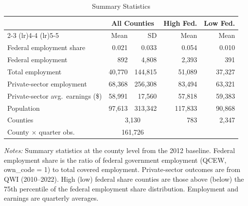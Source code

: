 \begin{table}[t]
\centering
\caption{Summary Statistics}
\label{tab:summary}
\begin{tabular}{l *{4}{r}}
\hline\hline
& \multicolumn{2}{c}{All Counties} & \multicolumn{1}{c}{High Fed.} & \multicolumn{1}{c}{Low Fed.} \\
\cmidrule(lr){2-3} \cmidrule(lr){4-4} \cmidrule(lr){5-5}
& Mean & SD & Mean & Mean \\
\hline
Federal employment share & 0.021 & 0.033 & 0.054 & 0.010 \\
Federal employment & 892 & 4,808 & 2,393 & 391 \\
Total employment & 40,770 & 144,815 & 51,089 & 37,327 \\
Private-sector employment & 68,368 & 256,308 & 83,494 & 63,321 \\
Private-sector avg.\ earnings (\$) & 58,991 & 17,560 & 57,818 & 59,383 \\
Population & 97,613 & 313,342 & 117,833 & 90,868 \\
\hline
Counties & \multicolumn{2}{c}{3,130} & 783 & 2,347 \\
County $\times$ quarter obs. & \multicolumn{2}{c}{161,726} & & \\
\hline\hline
\end{tabular}
\par\vspace{0.5em}\raggedright\small\textit{Notes:} Summary statistics at the county level from the 2012 baseline. Federal employment share is the ratio of federal government employment (QCEW, own\_code = 1) to total covered employment. Private-sector outcomes are from QWI (2010--2022). High (low) federal share counties are those above (below) the 75th percentile of the federal employment share distribution. Employment and earnings are quarterly averages.
\end{table}

